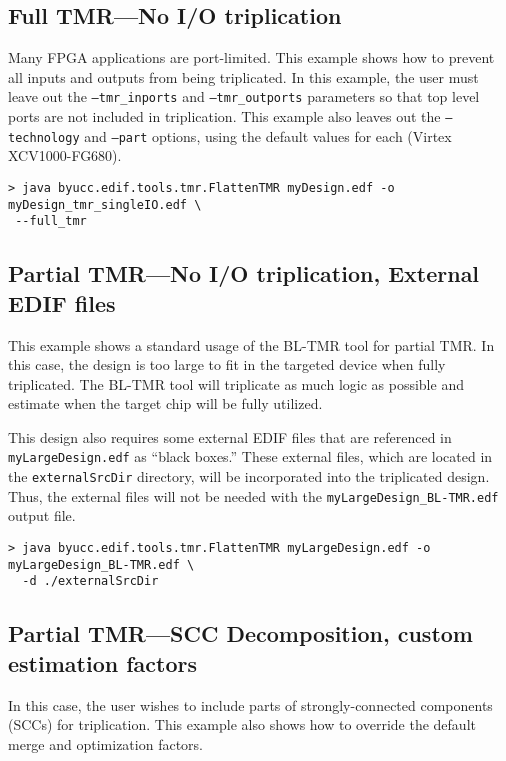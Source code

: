 \documentclass[english]{article}
\begin{document}
\subsection{Full TMR---No I/O triplication}
Many FPGA applications are port-limited. This example shows how to prevent all 
inputs and outputs from being triplicated. In this example, the user must leave 
out the \texttt{--tmr\_inports} and \texttt{--tmr\_outports} parameters so that 
top level ports are not included in triplication. This example also leaves out 
the \texttt{--technology} and \texttt{--part} options, using the default values 
for each (Virtex XCV1000-FG680).

\begin{verbatim}
> java byucc.edif.tools.tmr.FlattenTMR myDesign.edf -o myDesign_tmr_singleIO.edf \
 --full_tmr
\end{verbatim}


\subsection{Partial TMR---No I/O triplication, External EDIF files}
This example shows a standard usage of the BL-TMR tool for partial TMR\@. In this 
case, the design is too large to fit in the targeted device when fully 
triplicated. The BL-TMR tool will triplicate as much logic as possible and 
estimate when the target chip will be fully utilized.

This design also requires some external EDIF files that are referenced in 
\texttt{myLargeDesign.edf} as ``black boxes.'' These external files, which are 
located in the \texttt{externalSrcDir} directory, will be incorporated into the 
triplicated design. Thus, the external files will not be needed with the 
\texttt{myLargeDesign\_BL-TMR.edf} output file.

\begin{verbatim}
> java byucc.edif.tools.tmr.FlattenTMR myLargeDesign.edf -o myLargeDesign_BL-TMR.edf \
  -d ./externalSrcDir
\end{verbatim}


\subsection{Partial TMR---SCC Decomposition, custom estimation factors}
In this case, the user wishes to include parts of strongly-connected components 
(SCCs) for triplication. This example also shows how to override the default
merge and optimization factors.
\end{document}
